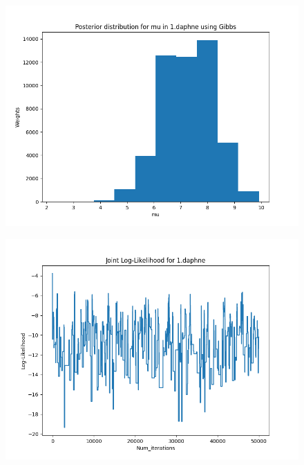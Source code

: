 \documentclass{article}
\begin{document}
\begin{enumerate}
\begin{enumerate}
\begin{figure}[!ht]
	\centering
	\includegraphics[scale=0.6]{../figs/Gibbs/posterior_histogram_1_daphne}
\end{figure}

\begin{figure}[!ht]
	\centering
	\includegraphics[scale=0.6]{../figs/Gibbs/joint_log_likelihood_1_daphne}
\end{figure}


\end{enumerate}
\end{enumerate}
\end{document}
